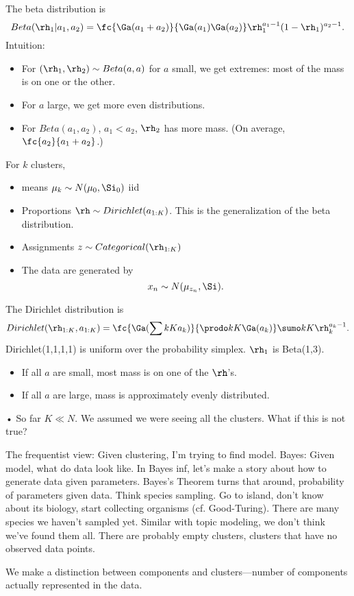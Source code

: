 The beta distribution is
$$
Beta(\rh_1|a_1,a_2) = \fc{\Ga(a_1+a_2)}{\Ga(a_1)\Ga(a_2)} \rh_1^{a_1-1} (1-\rh_1)^{a_2-1}.
$$
Intuition: 
\begin{itemize}
\item
For $(\rh_1,\rh_2)\sim Beta(a,a)$ for $a$ small, we get extremes: most of the mass is on one or the other.
\item
For $a$ large, we get more even distributions.
\item
For $Beta(a_1,a_2)$, $a_1<a_2$, $\rh_2$ has more mass. (On average, $\fc{a_2}{a_1+a_2}$.)
\end{itemize}
For $k$ clusters, 
\begin{itemize}
\item
means $\mu_k\sim N(\mu_0,\Si_0)$ iid
\item
Proportions
$\rh\sim Dirichlet(a_{1:K})$. This is the generalization of the beta distribution.
\item
Assignments
$z\sim Categorical(\rh_{1:K})$
\item
The data are generated by 
$$
x_n\sim N(\mu_{z_n},\Si).
$$
\end{itemize}
The Dirichlet distribution is
$$
Dirichlet(\rh_{1:K}, a_{1:K}) = \fc{\Ga(\sum kK a_k)}{\prodo kK \Ga(a_k)}\sumo kK \rh_k^{a_k-1}.
$$
Dirichlet(1,1,1,1) is uniform over the probability simplex. $\rh_1$ is Beta(1,3). 
\begin{itemize}
\item
If all $a$ are small, most mass is on one of the $\rh$'s.
\item
If all $a$ are large, mass is approximately evenly distributed.
\end{itemize}•
So far $K\ll N$. 
We assumed we were seeing all the clusters.
What if this is not true? 

The frequentist view: Given clustering, I'm trying to find model. Bayes: Given model, what do data look like. In Bayes inf, let's make a story about how to generate data given parameters. Bayes's Theorem turns that around, probability of parameters given data. %
Think species sampling. Go to island, don't know about its biology, start collecting organisms (cf. Good-Turing).
There are many species we haven't sampled yet.
Similar with topic modeling, we don't think we've found them all. There are probably empty clusters, clusters that have no observed data points.

We make a distinction between components and clusters---number of components actually represented in the data.

